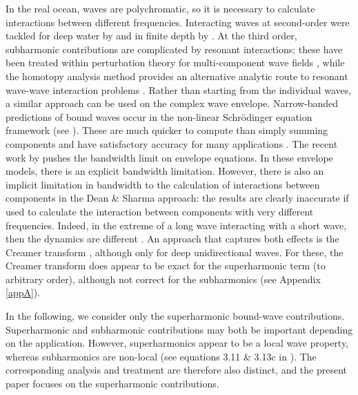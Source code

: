 \documentclass[lineno]{JFM-FLM_Au}
\begin{document}
In the real ocean, waves are polychromatic, so it is necessary to calculate interactions between different frequencies. Interacting waves at second-order were tackled for deep water by \citet{longuet1962resonant} and in finite depth by \cite{sharma1981second,dalzell1999note,forristall2000wave}. At the third order, subharmonic contributions are complicated by resonant interactions; these have been treated within perturbation theory for multi-component wave fields \citep{madsen2006third,madsen2012third}, while the homotopy analysis method provides an alternative analytic route to resonant wave-wave interaction problems \citep{xu_steady-state_2012,liao_homotopy_2011}. Rather than starting from the individual waves, a similar approach can be used on the complex wave envelope. Narrow-banded predictions of bound waves occur in the non-linear Schr\"{o}dinger equation framework (see \cite{trulsen1996modified}). These are much quicker to compute than simply summing components and have satisfactory accuracy for many applications \citep{adcock2016fast}. The recent work by \cite{li2021three} pushes the bandwidth limit on envelope equations. In these envelope models, there is an explicit bandwidth limitation. However, there is also an implicit limitation in bandwidth to the calculation of interactions between components in the Dean \& Sharma approach: the results are clearly inaccurate if used to calculate the interaction between components with very different frequencies. Indeed, in the extreme of a long wave interacting with a short wave, then the dynamics are different \citep{longuet1987propagation}. An approach that captures both effects is the Creamer transform \citep{creamer1989improved}, although only for deep unidirectional waves. For these, the Creamer transform does appear to be exact for the superharmonic term (to arbitrary order), although not correct for the subharmonics (see Appendix \ref{appA}). %

In the following, we consider only the superharmonic bound-wave contributions. Superharmonic and subharmonic contributions may both be important depending on the application. However, superharmonics appear to be a local wave property, whereas subharmonics are non-local (see equations 3.11 \& 3.13c in \cite{li2021three}). The corresponding analysis and treatment are therefore also distinct, and the present paper focuses on the superharmonic contributions.
\end{document}

